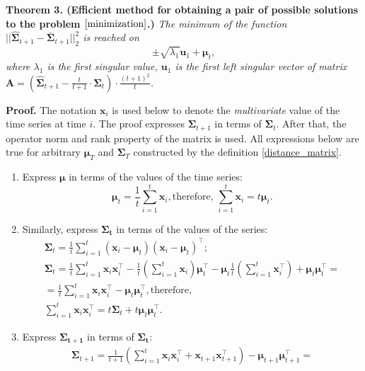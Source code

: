 \documentclass[12pt]{article}
\begin{document}
{\textbf{Theorem 3. (Efficient method for obtaining a pair of possible solutions to the problem $\eqref{minimization}$.)} \emph{ The minimum of the function $||\hat{\mathbf{\Sigma}}_{t+1} - \bar{\mathbf{\Sigma}}_{t+1}||_2^2$ is reached on \[\pm\sqrt{\lambda_1} \mathbf{u}_1 + \boldsymbol{\mu}_t,\] where $\lambda_1$ is the first singular value, $\mathbf{u}_1$ is the first left singular vector of matrix\\ $\mathbf{A}=\left(\hat{\mathbf{\Sigma}}_{t+1} - \frac{t}{t+1} \cdot \mathbf{\Sigma}_t \right) \cdot \frac{(t+1)^2}{t}$.}

\textbf{Proof.} The notation $\mathbf{x}_i$ is used below to denote the \emph{multivariate} value of the time series at time $i$. The proof expresses $\mathbf{\Sigma}_{t+1}$ in terms of $\mathbf{\Sigma}_t$. After that, the operator norm and rank property of the matrix is used. All expressions below are true for arbitrary $\boldsymbol{\mu}_T$ and $\mathbf{\Sigma}_T$ constructed by the definition \eqref{distance_matrix}.
\begin{enumerate}
	\item Express $\boldsymbol{\mu}$ in terms of the values of the time series: \[\boldsymbol{\mu}_t = \frac{1}{t} \sum_{i=1}^{t} \mathbf{x}_i, \text{therefore, } \sum_{i=1}^{t} \mathbf{x}_i = t \boldsymbol{\mu}_t.\]
	\item Similarly, express $\mathbf{\Sigma_t}$ in terms of the values of the series:
		\begin{gather*}
		\mathbf{\Sigma}_t = \frac{1}{t} \sum_{i=1}^{t} (\mathbf{x}_i-\boldsymbol{\mu}_t)(\mathbf{x}_i-\boldsymbol{\mu}_t)^\intercal;\\
		\mathbf{\Sigma}_t = \frac{1}{t} \sum_{i=1}^{t} \mathbf{x}_i \mathbf{x}_i^\intercal - \frac{1}{t} \left( \sum_{i=1}^{t} \mathbf{x}_i\right) \boldsymbol{\mu}_t^\intercal - \boldsymbol{\mu}_t \frac{1}{t} \left( \sum_{i=1}^{t} \mathbf{x}_i^\intercal\right) + \boldsymbol{\mu}_t \boldsymbol{\mu}_t^\intercal =\\= \frac{1}{t} \sum_{i=1}^{t} \mathbf{x}_i \mathbf{x}_i^\intercal - \boldsymbol{\mu}_t \boldsymbol{\mu}_t^\intercal, \text{therefore, }\\
		\sum_{i=1}^{t} \mathbf{x}_i \mathbf{x}_i^\intercal = t \mathbf{\Sigma}_t + t \boldsymbol{\mu}_t \boldsymbol{\mu}_t^\intercal.
		\end{gather*}
	\item Express $\mathbf{\Sigma_{t+1}}$ in terms of $\mathbf{\Sigma_t}$:
	\begin{gather*}
		\mathbf{\Sigma}_{t+1} = \frac{1}{t+1} \left(\sum_{i=1}^{t} \mathbf{x}_i \mathbf{x}_i^\intercal + \mathbf{x}_{t+1} \mathbf{x}_{t+1}^\intercal \right) - \boldsymbol{\mu}_{t+1} \boldsymbol{\mu}_{t+1}^\intercal = \\

\end{gather*}
\end{enumerate}}
\end{document}
